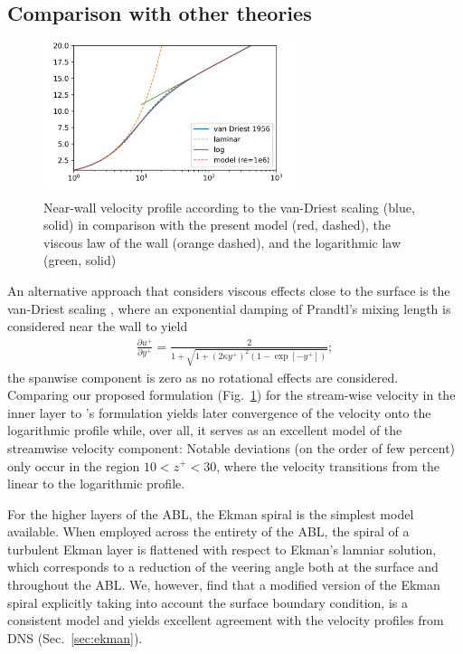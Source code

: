 \documentclass[smallcondensed,final]{svjour3}
\newcommand{\p}{\partial}
\begin{document}
\subsection{Comparison with other theories}
\begin{figure}
  \centerline{\includegraphics[width=0.66\textwidth]{../plot/vanDriest_profile.png}}
  \caption{Near-wall velocity profile according to the 
    van-Driest scaling (blue, solid) in comparison with 
    the present model (red, dashed), 
    the viscous law of the wall (orange dashed), and 
    the logarithmic law (green, solid)} 
  \label{fig:vanDriest}
\end{figure}  An alternative approach that considers viscous effects close to the surface is the van-Driest scaling \citep{vandriest:JOT1956}, 
where an exponential damping of Prandtl's mixing length is considered near the wall to yield 
\begin{align}
  \frac{\p u^+}{\p y^+} = \frac{2}{ 1+ \sqrt{1+\left(2\kappa y^+\right)^2 (1-\exp\left[-y^+\right])}};
\end{align}
the spanwise component is zero as no rotational effects are considered. 
%
Comparing our proposed formulation (Fig.~\ref{fig:vanDriest}) for the stream-wise velocity in the inner layer to  \citeauthor{vandriest:JOT1956}'s formulation 
yields later convergence of the velocity onto the logarithmic profile while, over all, it serves as an excellent model of the streamwise 
velocity component:
% 
Notable deviations (on the order of few percent) only occur in the region $10 < z^+ < 30$, 
where the velocity transitions from the linear to the logarithmic profile. 


For the higher layers of the ABL, the Ekman spiral is the simplest model available. When employed across the entirety of the ABL, the spiral of a turbulent Ekman layer is flattened with respect to Ekman's lamniar solution, which  corresponds to a reduction of the veering angle both at the surface and throughout the ABL. We, however, find that a modified version of the Ekman spiral explicitly taking into account the surface boundary condition, is a consistent model and yields excellent agreement with the velocity profiles from DNS (Sec.~\ref{sec:ekman}). 
\end{document}
